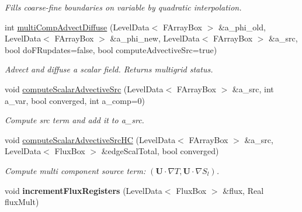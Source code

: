 \begin{DoxyCompactItemize}
\begin{DoxyCompactList}\small\item\em Fills coarse-\/fine boundaries on variable by quadratic interpolation. \end{DoxyCompactList}\item 
int \hyperlink{class_a_m_r_level_mushy_layer_adc086e9a094b35435de36aadb3891ab7}{multi\-Comp\-Advect\-Diffuse} (Level\-Data$<$ F\-Array\-Box $>$ \&a\-\_\-phi\-\_\-old, Level\-Data$<$ F\-Array\-Box $>$ \&a\-\_\-phi\-\_\-new, Level\-Data$<$ F\-Array\-Box $>$ \&a\-\_\-src, bool do\-F\-Rupdates=false, bool compute\-Advective\-Src=true)
\begin{DoxyCompactList}\small\item\em Advect and diffuse a scalar field. Returns multigrid status. \end{DoxyCompactList}\item 
\hypertarget{class_a_m_r_level_mushy_layer_af640c8b9d905e16e6b90b6c4f1c7fda2}{void \hyperlink{class_a_m_r_level_mushy_layer_af640c8b9d905e16e6b90b6c4f1c7fda2}{compute\-Scalar\-Advective\-Src} (Level\-Data$<$ F\-Array\-Box $>$ \&a\-\_\-src, int a\-\_\-var, bool converged, int a\-\_\-comp=0)}\label{class_a_m_r_level_mushy_layer_af640c8b9d905e16e6b90b6c4f1c7fda2}

\begin{DoxyCompactList}\small\item\em Compute src term and add it to a\-\_\-src. \end{DoxyCompactList}\item 
\hypertarget{class_a_m_r_level_mushy_layer_ab376d561af9e6d98881d71bb00184b7f}{void \hyperlink{class_a_m_r_level_mushy_layer_ab376d561af9e6d98881d71bb00184b7f}{compute\-Scalar\-Advective\-Src\-H\-C} (Level\-Data$<$ F\-Array\-Box $>$ \&a\-\_\-src, Level\-Data$<$ Flux\-Box $>$ \&edge\-Scal\-Total, bool converged)}\label{class_a_m_r_level_mushy_layer_ab376d561af9e6d98881d71bb00184b7f}

\begin{DoxyCompactList}\small\item\em Compute multi component source term\-: $ (\mathbf{U} \cdot \nabla T, \mathbf{U} \cdot \nabla S_l)$. \end{DoxyCompactList}\item 
\hypertarget{class_a_m_r_level_mushy_layer_a3ea7646ada59f1476523b7a71fa7c40d}{void {\bfseries increment\-Flux\-Registers} (Level\-Data$<$ Flux\-Box $>$ \&flux, Real flux\-Mult)}\label{class_a_m_r_level_mushy_layer_a3ea7646ada59f1476523b7a71fa7c40d}


\end{DoxyCompactItemize}
